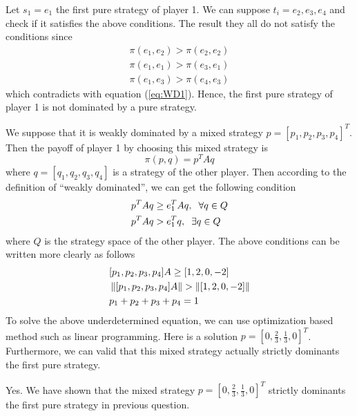 \documentclass[a4 paper, 12pt]{article}
\begin{document}

  
Let $s_1 = e_1$ the first pure strategy of player 1. We can suppose $t_i = e_2, e_3, e_4$ and check if it satisfies the above conditions. The result they all do not satisfy the conditions since 
\begin{equation}
        \begin{aligned}
                \pi(e_1,e_2) > \pi(e_2,e_2) \\
                \pi(e_1,e_1) > \pi(e_3,e_1) \\
                \pi(e_1,e_3) > \pi(e_4,e_3)
        \end{aligned}
\end{equation}
which contradicts with equation (\ref{eq:WD1}). Hence, the first pure strategy of player 1 is not dominated by a pure strategy.

 We suppose that it is weakly dominated by a mixed strategy $p = [p_1,p_2,p_3,p_4]^T$. Then the payoff of player 1 by choosing this mixed strategy is 
\begin{equation}
        \pi(p,q) = p^TAq
\end{equation}
where $q = [q_1,q_2,q_3,q_4]$ is a strategy of the other player. Then according to the definition of ``weakly dominated'', we can get the following condition
\begin{align}
        &p^TAq \geq e_1^TAq, \hspace{0.2cm} \forall q\in Q \\
        &p^TAq > e_1^Tq, \hspace{0.2cm} \exists q\in Q
\end{align}
where $Q$ is the strategy space of the other player. The above conditions can be written more clearly as follows
\begin{align}
        &[p_1,p_2,p_3,p_4]A \geq [1,2,0,-2] \\
        &\left\|[p_1,p_2,p_3,p_4]A\right\| > \left\|[1,2,0,-2]\right\| \\
        &p_1 + p_2 + p_3 + p_4 = 1
\end{align}
To solve the above underdetermined equation, we can use optimization based method such as linear programming. Here is a solution $p = [0, \frac{2}{3}, \frac{1}{3}, 0]^T$. Furthermore, we can valid that this mixed strategy actually strictly dominants the first pure strategy.

 Yes. We have shown that the mixed strategy $p = [0, \frac{2}{3}, \frac{1}{3}, 0]^T$ strictly dominants the first pure strategy in previous question.
\end{document}

